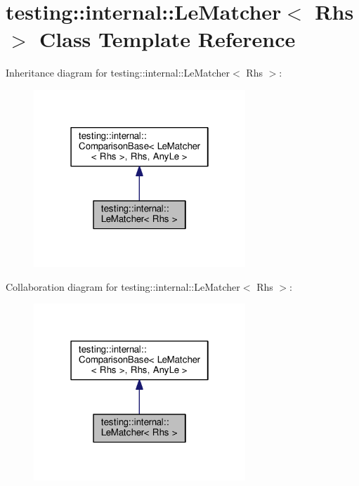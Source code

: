 \hypertarget{classtesting_1_1internal_1_1LeMatcher}{}\section{testing\+:\+:internal\+:\+:Le\+Matcher$<$ Rhs $>$ Class Template Reference}
\label{classtesting_1_1internal_1_1LeMatcher}


Inheritance diagram for testing\+:\+:internal\+:\+:Le\+Matcher$<$ Rhs $>$\+:\nopagebreak
\begin{figure}[H]
\begin{center}
\leavevmode
\includegraphics[width=226pt]{classtesting_1_1internal_1_1LeMatcher__inherit__graph}
\end{center}
\end{figure}


Collaboration diagram for testing\+:\+:internal\+:\+:Le\+Matcher$<$ Rhs $>$\+:\nopagebreak
\begin{figure}[H]
\begin{center}
\leavevmode
\includegraphics[width=226pt]{classtesting_1_1internal_1_1LeMatcher__coll__graph}
\end{center}
\end{figure}
